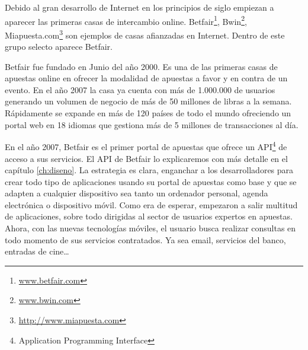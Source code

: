  Debido al gran desarrollo de Internet en los principios de siglo empiezan a aparecer las primeras casas de intercambio %
  online. Betfair\footnote{\url{www.betfair.com}}, Bwin\footnote{\url{www.bwin.com}}, Miapuesta.com\footnote{\url{http://www.miapuesta.com}} son ejemplos de casas afianzadas en Internet. %
   Dentro de este grupo selecto aparece Betfair.%
 

 Betfair fue fundado en Junio del año 2000. Es una de las primeras casas de apuestas online en ofrecer la modalidad de apuestas a favor y en contra de un evento. En el año 2007 la casa ya cuenta con más de 1.000.000 de usuarios generando un volumen de negocio de más de 50 millones de libras a la semana. Rápidamente se expande en más de 120 países de todo el mundo ofreciendo un portal web en 18 idiomas que gestiona más de 5 millones de transacciones al día. %


En el año 2007, Betfair es el primer portal de apuestas que ofrece un API\footnote{Application Programming Interface} %
 de acceso a sus servicios. El API de Betfair lo explicaremos con más detalle en el capítulo \ref{ch:diseno}. La estrategia es clara, enganchar a los desarrolladores para crear todo tipo de aplicaciones usando su portal de apuestas como base y que se adapten a cualquier dispositivo sea tanto un ordenador personal, agenda electrónica o dispositivo móvil. Como era de esperar, empezaron a salir multitud de aplicaciones, sobre todo dirigidas al sector de usuarios expertos en apuestas. Ahora, con las nuevas tecnologías móviles, el usuario busca realizar consultas en todo momento de sus servicios contratados. Ya sea email, servicios del banco, entradas de cine\ldots %

